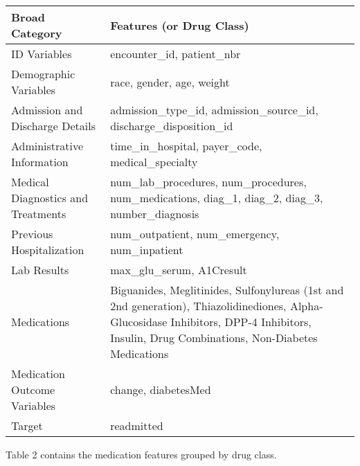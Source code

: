 \documentclass{article}      %
\begin{document}
\begin{table}[h!]
    \centering
    \begin{tabular}{|l|p{8cm}|}
    \hline
    \textbf{Broad Category} & \textbf{Features (or Drug Class)} \\ \hline \hline
    ID Variables & encounter\_id, patient\_nbr \\ \hline
    Demographic Variables & race, gender, age, weight \\ \hline
    Admission and Discharge Details & admission\_type\_id, admission\_source\_id, discharge\_disposition\_id \\ \hline
    Administrative Information & time\_in\_hospital, payer\_code, medical\_specialty \\ \hline
    Medical Diagnostics and Treatments & num\_lab\_procedures, num\_procedures, num\_medications, diag\_1, diag\_2, diag\_3, number\_diagnosis \\ \hline
    Previous Hospitalization & num\_outpatient, num\_emergency, num\_inpatient\\ \hline
    Lab Results & max\_glu\_serum, A1Cresult \\ \hline
    Medications & Biguanides, Meglitinides, Sulfonylureas (1st and 2nd generation), Thiazolidinediones, Alpha-Glucosidase Inhibitors, DPP-4 Inhibitors, Insulin, Drug Combinations, Non-Diabetes Medications \\ \hline
    Medication Outcome Variables & change, diabetesMed \\ \hline
    Target & readmitted \\ \hline
    \end{tabular}
    \label{table:features_by_category}
\end{table}

\FloatBarrier
Table 2 contains the medication features grouped by drug class. 
\end{document}
